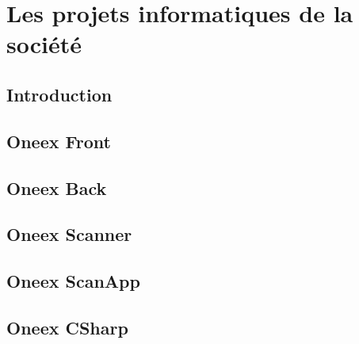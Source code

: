 
\section{Les projets informatiques de la société}

\subsection{Introduction}


\subsection{Oneex Front}


\subsection{Oneex Back}


\subsection{Oneex Scanner}


\subsection{Oneex ScanApp}


\subsection{Oneex CSharp}

